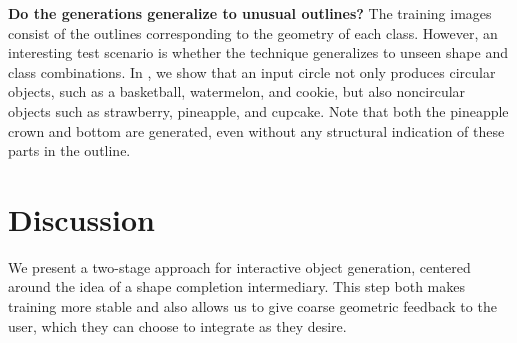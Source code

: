 
\vspace{2mm} \noindent \textbf{Do the generations generalize to unusual outlines?} The training images consist of the outlines corresponding to the geometry of each class. However, an interesting test scenario is whether the technique generalizes to unseen shape and class combinations. In , we show that an input circle not only produces circular objects, such as a basketball, watermelon, and cookie, but also noncircular objects such as strawberry, pineapple, and cupcake. Note that both the pineapple crown and bottom are generated, even without any structural indication of these parts in the outline.



\section{Discussion}


We present a two-stage approach for interactive object generation, centered around the idea of a shape completion intermediary. This step both makes training more stable and also allows us to give coarse geometric feedback to the user, which they can choose to integrate as they desire. 